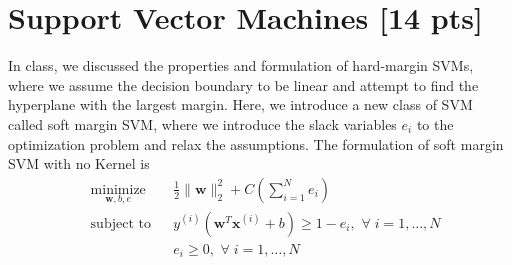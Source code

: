 \section{Support Vector Machines [14 pts]}

 In class, we discussed the properties and formulation of hard-margin SVMs, where we assume the decision boundary to be linear and attempt to find the hyperplane with the largest margin. Here, we introduce a new class of SVM called soft margin SVM, where we introduce the slack variables $e_i$ to the optimization problem and relax the assumptions. The formulation of soft margin SVM with no Kernel is
    \begin{equation*}
    \begin{aligned}
    & \underset{\mathbf{w}, b, e}{\text{minimize}}
    & & \frac{1}{2}\|\mathbf{w}\|_2^2 + C\left(\sum_{i = 1}^N e_i\right)\\
    & \text{subject to}
    & & y^{(i)}(\mathbf{w}^T\mathbf{x}^{(i)} + b) \geq 1 - e_i, \, \, \forall \; i = 1, \dots, N\\
    & & & e_i \geq 0, \, \, \forall \; i = 1, \dots, N
    \end{aligned}
    \end{equation*}
